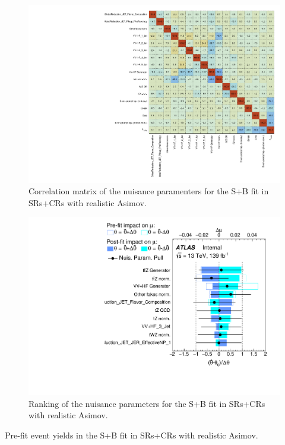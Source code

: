 \begin{figure}[htbp]
	\centering
	\includegraphics[width=.95\textwidth]{Chapters/CH8/figures/SPLUSB_CRSR_UsingDL1rcFullSys/CorrMatrix}
	\caption{Correlation matrix of the nuisance paramenters for the S+B \tZc fit in SRs+CRs with realistic Asimov.}%
	\label{fig:stat:tzc:splusb:crsr:corrmatrix}
\end{figure}

\begin{figure}[htbp]
	\centering
	\includegraphics[width=.9\textwidth]{Chapters/CH8/figures/SPLUSB_CRSR_UsingDL1rcFullSys/Ranking}
	\caption{Ranking of the nuisance parameters for the S+B \tZc fit in SRs+CRs with realistic Asimov.}%
	\label{fig:stat:tzc:splusb:crsr:ranking}
\end{figure}

\FloatBarrier
\clearpage
\begin{table}[]
	\centering
	\tiny
	
	\caption{Pre-fit event yields in the S+B \tZc fit in SRs+CRs with realistic Asimov. \TabErrStatSys} 
	\label{tab:stat:tzc:splusb:crsr:yields:prefit}
\end{table} 

